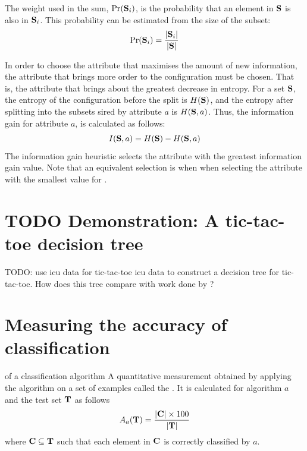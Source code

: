 The weight used in the sum, $\mbox{Pr}({\bf S}_i)$, is the probability that an element in ${\bf S}$ is also in ${\bf S}_i$.  This probability can be estimated from the size of the subset:
\begin{equation}
\mbox{Pr}({\bf S}_i) = \frac{|{\bf S}_i|}{|{\bf S}|}
\label{eq:subset_probability}
\end{equation}

In order to choose the attribute that maximises the amount of new information, the attribute that brings more order to the configuration must be chosen.  That is, the attribute that brings about the greatest decrease in entropy. For a set ${\bf S}$, the entropy of the configuration before the split is $H({\bf S})$, and the entropy after splitting into the subsets sired by attribute $a$ is $H({\bf S},a)$. Thus, the information gain for attribute $a$, is calculated as follows:
\begin{equation}
I({\bf S},a) = H({\bf S}) - H({\bf S},a)
\label{eq:gain}
\end{equation}
The information gain heuristic selects the attribute with the greatest information gain value. Note that an equivalent selection is when when selecting the attribute with the smallest value for . 
\section{TODO Demonstration: A tic-tac-toe decision tree}
TODO: use icu data for tic-tac-toe icu data to construct a decision tree for tic-tac-toe.  How does this tree compare with work done by \cite{utgoff:feature}?


\section{Measuring the accuracy of classification}
 {of a classification algorithm} {A quantitative measurement obtained by applying the algorithm on a set of examples called the . It is calculated for algorithm $a$ and the test set ${\bf T}$ as follows
\begin{equation}
A_a({\bf T}) = \frac{|{\bf C}| \times 100}{|{\bf T}|}
\end{equation}
where ${\bf C} \subseteq {\bf T}$ such that each element in ${\bf C} $ is correctly classified by $a$.
}  

